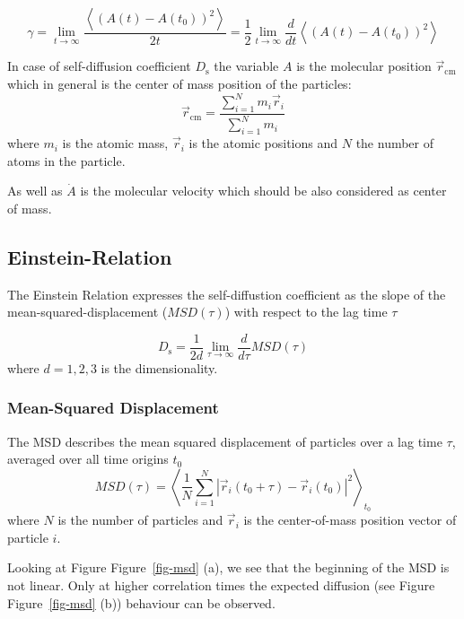 \documentclass[
  letterpaper,
]{article}
\begin{document}
\[
\gamma = \lim_{t\to\infty} \frac{\left < (A(t) - A(t_0))^2 \right >}{2t} = \frac{1}{2} \lim_{t\to\infty} \frac{d}{dt} \left < (A(t) - A(t_0))^2 \right >
\]

In case of self-diffusion coefficient \(D_{\mathrm{s}}\) the variable
\(A\) is the molecular position \(\vec{r}_{\mathrm{cm}}\) which in
general is the center of mass position of the particles: \[
\vec{r}_{\mathrm{cm}} = \frac{\sum_{i=1}^{N} m_i \vec{r}_i}{\sum_{i=1}^{N} m_i}
\] where \(m_i\) is the atomic mass, \(\vec{r}_i\) is the atomic
positions and \(N\) the number of atoms in the particle.

As well as \(\dot{A}\) is the molecular velocity which should be also
considered as center of mass.

\hypertarget{einstein-relation-1}{%
\subsection*{Einstein-Relation}\label{einstein-relation-1}}


The Einstein Relation expresses the self-diffustion coefficient as the
slope of the mean-squared-displacement (\(MSD(\tau)\)) with respect to
the lag time \(\tau\)

\[
D_{\mathrm{s}} = \frac{1}{2 d} \lim _{\tau \to \infty} \frac{d}{d \tau} MSD(\tau)
\] where \(d=1,2,3\) is the dimensionality.

\hypertarget{mean-squared-displacement}{%
\subsubsection*{Mean-Squared
Displacement}\label{mean-squared-displacement}}

The MSD describes the mean squared displacement of particles over a lag
time \(\tau\), averaged over all time origins \(t_0\) \[
MSD(\tau) = \left < \frac{1}{N} \sum_{i=1}^{N} |\vec{r} _{i}(t_0 + \tau) - \vec{r} _{i}(t_0)|^2  \right >_{t_0}
\] where \(N\) is the number of particles and \(\vec{r}_{i}\) is the
center-of-mass position vector of particle \(i\).

Looking at Figure Figure~\ref{fig-msd} (a), we see that the beginning of
the MSD is not linear. Only at higher correlation times the expected
diffusion (see Figure Figure~\ref{fig-msd} (b)) behaviour can be
observed.
\end{document}
